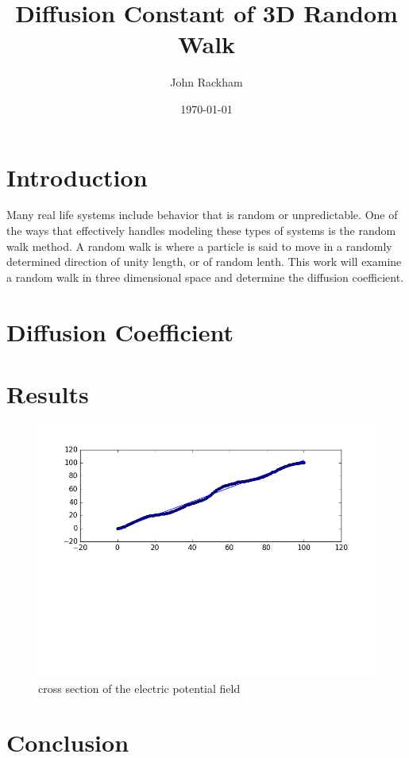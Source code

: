 \documentclass[aps,prb,twocolumn,amsfonts,showpacs,letterpaper]{revtex4}
\begin{document}
	\title{Diffusion Constant of 3D Random Walk}
	\author{John Rackham}
	\date{\today} 

\maketitle

\section{Introduction}\label{intro}
Many real life systems include behavior that is random or unpredictable. One of the ways that effectively handles modeling these types of systems is the random walk method. A random walk is where a particle is said to move in a randomly determined direction of unity length, or of random lenth\cite{gio}. This work will examine a random walk in three dimensional space and determine the diffusion coefficient.

\section{Diffusion Coefficient}

\section{Results}

\begin{figure}[H]
\centering
\includegraphics[scale=0.35]{figure_1.png}
\caption{cross section of the electric potential field}
\label{Voltage}
\end{figure}


\section{Conclusion}


\end{document}
